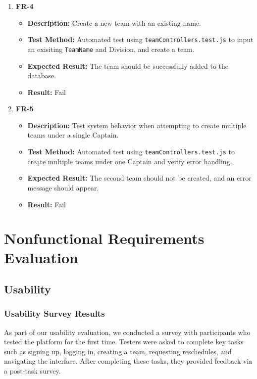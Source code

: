 \documentclass[12pt, titlepage]{article}
\begin{document}
\begin{enumerate}
    \item \textbf{FR-4}  
    \begin{itemize}
        \item \textbf{Description:} Create a new team with an existing name.
        \item \textbf{Test Method:} Automated test using \texttt{teamControllers.test.js} to input an exisiting \texttt{TeamName} and Division, and create a team.
        \item \textbf{Expected Result:} The team should be successfully added to the database.
        \item \textbf{Result:} Fail
    \end{itemize}
    \item \textbf{FR-5}  
    \begin{itemize}
        \item \textbf{Description:} Test system behavior when attempting to create multiple teams under a single Captain.
        \item \textbf{Test Method:} Automated test using \texttt{teamControllers.test.js} to create multiple teams under one Captain and verify error handling.
        \item \textbf{Expected Result:} The second team should not be created, and an error message should appear.
        \item \textbf{Result:} Fail 
    \end{itemize}
\end{enumerate}

\section{Nonfunctional Requirements Evaluation}

\subsection{Usability}

\subsubsection{Usability Survey Results}

As part of our usability evaluation, we conducted a survey with participants who tested the platform for the first time. Testers were asked to complete key tasks such as signing up, logging in, creating a team, requesting reschedules, and navigating the interface. After completing these tasks, they provided feedback via a post-task survey.\\
\end{document}
